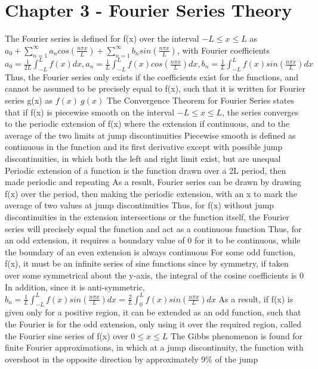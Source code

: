 \documentclass[11 pt, twoside]{article}
\newenvironment{outline*}
{
	\begin{outline}[enumerate]
	}
	{\end{outline}
}
\begin{document}
\section{Chapter 3 - Fourier Series Theory}
\begin{outline*}
\1 The Fourier series is defined for f(x) over the interval $-L \leq x \leq L$ as $a_0 + \sum^{\infty}_{n = 1} a_ncos(\frac{n\pi x}{L}) + \sum^{\infty}_{n = 1} b_nsin(\frac{n\pi x}{L})$, with Fourier coefficients $a_0 = \frac{1}{2L} \int^L_{-L} f(x)dx, a_n = \frac{1}{L}\int^L_{-L} f(x)cos(\frac{n\pi x}{L})dx, b_n = \frac{1}{L}\int^L_{-L} f(x)sin(\frac{n\pi x}{L})dx$
	\2 Thus, the Fourier series only exists if the coefficients exist for the functions, and cannot be assumed to be precisely equal to f(x), such that it is written for Fourier series g(x) as $f(x) ~ g(x)$
\1 The Convergence Theorem for Fourier Series states that if f(x) is piecewise smooth on the interval $-L \leq x \leq L$, the series converges to the periodic extension of f(x) where the extension if continuous, and to the average of the two limits at jump discontinuities
	\2 Piecewise smooth is defined as continuous in the function and its first derivative except with possible jump discontinuities, in which both the left and right limit exist, but are unequal
	\2 Periodic extension of a function is the function drawn over a 2L period, then made periodic and repeating
	\2 As a result, Fourier series can be drawn by drawing f(x) over the period, then making the periodic extension, with an x to mark the average of two values at jump discontinuities
	\2 Thus, for f(x) without jump discontinuities in the extension intersections or the function itself, the Fourier series will precisely equal the function and act as a continuous function
		\3 Thus, for an odd extension, it requires a boundary value of 0 for it to be continuous, while the boundary of an even extension is always continuous
\1 For some odd function, f(x), it must be an infinite series of sine functions since by symmetry, if taken over some symmetrical about the y-axis, the integral of the cosine coefficients is 0
	\2 In addition, since it is anti-symmetric, $b_n = \frac{1}{L} \int^L_{-L} f(x)sin(\frac{n\pi x}{L})dx = \frac{2}{L}\int^L_0 f(x)sin(\frac{n\pi x}{L})dx$
	\2 As a result, if f(x) is given only for a positive region, it can be extended as an odd function, such that the Fourier is for the odd extension, only using it over the required region, called the Fourier sine series of f(x) over $0 \leq x \leq L$
\1 The Gibbs phenomenon is found for finite Fourier approximations, in which at a jump discontinuity, the function with overshoot in the opposite direction by approximately 9\% of the jump

\end{outline*}
\end{document}
